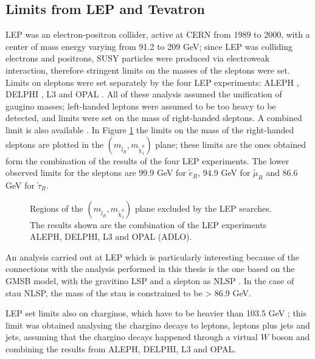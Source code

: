 \subsection{Limits from LEP and Tevatron}
\label{sec:LEPTEVATRONlimits}

LEP was an electron-positron collider, active at CERN from 1989 to 2000, with a center of mass energy varying from 91.2 to 209 GeV; since LEP was colliding electrons and positrons, SUSY particles were produced via electroweak interaction, therefore stringent limits on the masses of the sleptons were set. Limits on sleptons were set separately by the four LEP experiments: ALEPH \cite{aleph:sleptons}, DELPHI \cite{delphi:sleptons}, L3 \cite{L3:sleptons} and OPAL \cite{opal:sleptons}. All of these analysis assumed the unification of gaugino masses; left-handed leptons were assumed to be too heavy to be detected, and limits were set on the mass of right-handed sleptons. A combined limit is also available \cite{LEPWG:sleptons}. In Figure \ref{fig:LEPsleptons} the limits on the mass of the right-handed sleptons are plotted in the $\left( m_{\tilde{l}_R} , m_{\tilde{\chi}_1^0}   \right)$ plane; these limits are the ones obtained form the combination of the results of the four LEP experiments. The lower observed limits for the sleptons are 99.9 GeV for $\tilde{e}_R$, 94.9 GeV for $\tilde{\mu}_R$ and 86.6 GeV for $\tilde{\tau}_R$.

\begin{figure}[h]
\begin{center}
\end{center}
\caption[LEP limits on sleptons masses]{Regions of the $\left( m_{\tilde{l}_R} , m_{\tilde{\chi}_1^0}   \right)$ plane excluded by the LEP searches. The results shown are the combination of the LEP experiments ALEPH, DELPHI, L3 and OPAL (ADLO).}
\label{fig:LEPsleptons}
\end{figure}

An analysis carried out at LEP which is particularly interesting because of the connections with the analysis performed in this thesis is the one based on the GMSB model, with the gravitino LSP and a slepton as NLSP \cite{LEPWG:gmsb}. In the case of stau NLSP, the mass of the stau is constrained to be > 86.9 GeV.

LEP set limits also on charginos, which have to be heavier than 103.5 GeV \cite{LEPWG:chargino}; this limit was obtained analysing the chargino decays to leptons, leptons plus jets and jets, assuming that the chargino decays happened through a virtual $W$ boson and combining the results from ALEPH, DELPHI, L3 and OPAL.

